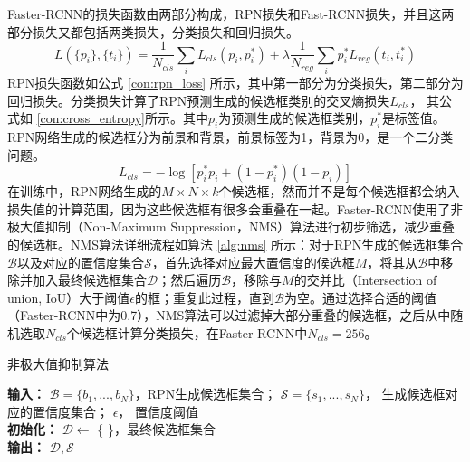 Faster-RCNN的损失函数由两部分构成，RPN损失和Fast-RCNN损失，并且这两部分损失又都包括两类损失，分类损失和回归损失。
\begin{equation}
L(\{p_i\},\{t_i\}) =\frac{1}{N_{cls}} \sum_{i}L_{cls}(p_i, p^*_i) + \lambda \frac{1}{N_{reg}} \sum_{i} p^*_i L_{reg}(t_i,t^*_i)
\label{con:rpn_loss}
\end{equation}
RPN损失函数如公式 \ref{con:rpn_loss} 所示，其中第一部分为分类损失，第二部分为回归损失。分类损失计算了RPN预测生成的候选框类别的交叉熵损失$L_{cls}$， 其公式如 \ref{con:cross_entropy}所示。其中$p_i$为预测生成的候选框类别，$p^*_i$是标签值。RPN网络生成的候选框分为前景和背景，前景标签为1，背景为0，是一个二分类问题。
\begin{equation}
L_{cls} = -\log[p^*_ip_i + (1-p^*_i)(1-p_i)]
\label{con:cross_entropy}
\end{equation}
在训练中，RPN网络生成的$M \times N \times k$个候选框，然而并不是每个候选框都会纳入损失值的计算范围，因为这些候选框有很多会重叠在一起。Faster-RCNN使用了非极大值抑制（Non-Maximum Suppression，NMS）算法进行初步筛选，减少重叠的候选框。NMS算法详细流程如算法 \ref{alg:nms} 所示：对于RPN生成的候选框集合 $\mathcal{B}$以及对应的置信度集合$\mathcal{S}$，首先选择对应最大置信度的候选框$M$，将其从$\mathcal{B}$中移除并加入最终候选框集合$\mathcal{D}$；然后遍历$\mathcal{B}$，移除与$M$的交并比（Intersection of union, IoU）大于阈值$\epsilon$的框；重复此过程，直到$\mathcal{B}$为空。通过选择合适的阈值（Faster-RCNN中为0.7），NMS算法可以过滤掉大部分重叠的候选框，之后从中随机选取$N_{cls}$个候选框计算分类损失，在Faster-RCNN中$N_{cls} = 256$。
\begin{algorithm}[t]
	\caption{非极大值抑制算法}
	\label{alg:nms}
	\textbf{输入： } $\mathcal{B}=\{b_1,...,b_N\}$，RPN生成候选框集合； $\mathcal{S}=\{s_1,...,s_N\}$， 生成候选框对应的置信度集合； $\epsilon$， 置信度阈值 \\
	\textbf{初始化：} $\mathcal{D} \leftarrow$ \{ \}，最终候选框集合 \\
	\textbf{输出： } $\mathcal{D},\mathcal{S}$
\end{algorithm}

